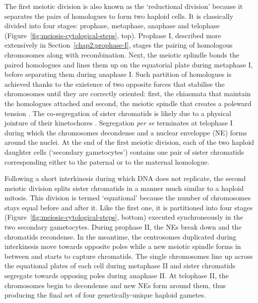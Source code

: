 The first meiotic division is also known as the ‘reductional division’ because it separates the pairs of homologues to form two haploid cells. 
It is classically divided into four stages: prophase, metaphase, anaphase and telophase (Figure~\ref{fig:meiosis-cytological-steps}, top).
Prophase I, described more extensively in Section~\ref{chap2:prophase-I}, stages the pairing of homologous chromosomes along with recombination.
Next, the meiotic splindle bonds the paired homologues and lines them up on the equatorial plate during metaphase I, before separating them during anaphase I. 
Such partition of homologues is achieved thanks to the existence of two opposite forces that stabilise the chromosomes until they are correctly oriented: first, the chiasmata that maintain the homologues attached and second, the meiotic spindle that creates a poleward tension \citep{petronczki2003menage}.
The co-segregation of sister chromatids is likely due to a physical jointure of their kinetochores \citep{nasmyth2015meiotic}.
Segregation \textit{per se} terminates at telophase I during which the chromosomes decondense and a nuclear enveloppe (NE) forms around the nuclei.
At the end of the first meiotic division, each of the two haploid daughter cells (‘secondary gametocytes’) contains one pair of sister chromatids corresponding either to the paternal or to the maternal homologue.

Following a short interkinesis during which DNA does not replicate, the second meiotic division splits sister chromatids in a manner much similar to a haploid mitosis. 
This division is termed ‘equational’ because the number of chromosomes stays equal before and after it.
Like the first one, it is partitioned into four stages (Figure~\ref{fig:meiosis-cytological-steps}, bottom) executed synchroneously in the two secondary gametocytes.
During prophase II, the NEs break down and the chromatids recondense. 
In the meantime, the centrosomes duplicated during interkinesis move towards opposite poles while a new meiotic spindle forms in between and starts to capture chromatids.
The single chromosomes line up across the equational plates of each cell during metaphase II and sister chromatids segregate towards opposing poles during anaphase II\@.
At telophase II, the chromosomes begin to decondense and new NEs form around them, thus producing the final set of four genetically-unique haploid gametes.\\

